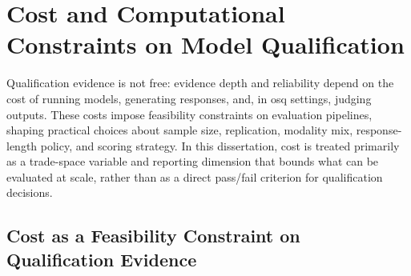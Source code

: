 \section{Cost and Computational Constraints on Model Qualification}
\label{sec:ch2_cost}




Qualification evidence is not free: evidence depth and reliability depend on the cost of running models, generating responses, and, in \ac{osq} settings, judging outputs. These costs impose feasibility constraints on evaluation pipelines, shaping practical choices about sample size, replication, modality mix, response-length policy, and scoring strategy. In this dissertation, cost is treated primarily as a trade-space variable and reporting dimension that bounds what can be evaluated at scale, rather than as a direct pass/fail criterion for qualification decisions.


\subsection{Cost as a Feasibility Constraint on Qualification Evidence}
\label{subsec:ch2_cost_feasibility}


